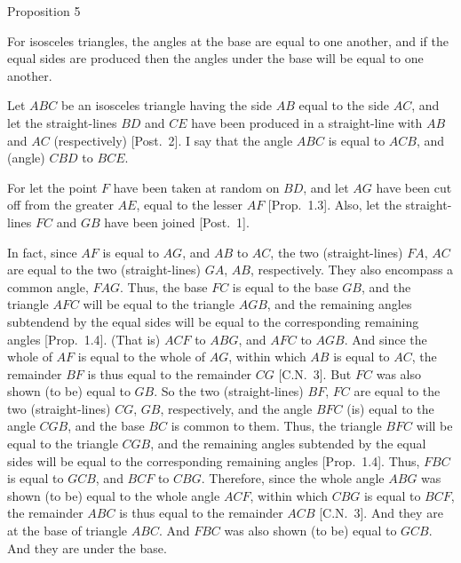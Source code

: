 
\begin{center}
{\large Proposition 5}
\end{center}

For isosceles triangles, the angles at the base are equal to one another, and if
the equal sides are produced then the angles under the base will be equal to one another.

\epsfysize=1.85in
\centerline{}

Let $ABC$ be an isosceles triangle having the side $AB$ equal to the side $AC$, and let the straight-lines $BD$ and $CE$ have been produced in a straight-line
with $AB$ and $AC$ (respectively) [Post.~2]. I say that the angle $ABC$ is equal to $ACB$, and (angle) $CBD$  to $BCE$.

For let the point $F$ have been taken at random on  $BD$, and let $AG$
have been cut off from the greater $AE$, equal to the lesser $AF$ [Prop.~1.3]. Also, let
the straight-lines $FC$ and $GB$ have been joined [Post.~1].

In fact, since $AF$ is equal to $AG$, and $AB$ to $AC$, the two (straight-lines) $FA$, $AC$ are
equal to the two (straight-lines) $GA$, $AB$, respectively. They also encompass a
common angle, $FAG$. Thus, the base $FC$ is equal to the base $GB$, and the
triangle $AFC$ will be equal to the triangle $AGB$, and the remaining angles
subtendend by the equal sides will
be equal to the corresponding  remaining angles [Prop.~1.4].  (That is) $ACF$ to $ABG$, and $AFC$ to $AGB$. And since the whole of $AF$ is
equal to the whole of $AG$, within which $AB$ is equal to $AC$, the remainder
$BF$ is thus equal to the remainder $CG$ [C.N.~3]. But $FC$ was also shown (to be) equal to $GB$. So
the two (straight-lines) $BF$, $FC$ are equal to the two (straight-lines) $CG$, $GB$, respectively,
and the angle $BFC$ (is) equal to the angle $CGB$, and the base $BC$ is common to
them. Thus, the triangle $BFC$ will be equal to the triangle $CGB$, and
the remaining angles subtended by the equal sides will be equal to the corresponding remaining angles [Prop.~1.4]. Thus, $FBC$ is equal to $GCB$, and $BCF$ to
$CBG$. Therefore, since the whole angle $ABG$ was shown (to be) equal to the
whole angle $ACF$, within which $CBG$ is equal to $BCF$, the remainder $ABC$
is thus equal to the remainder $ACB$ [C.N.~3]. And they are at the base of triangle
$ABC$. And $FBC$ was also shown (to be) equal to $GCB$. And they are under
the base.

